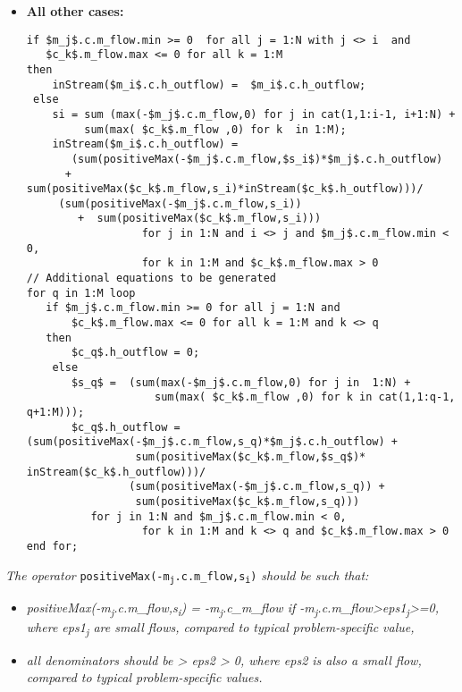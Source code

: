 \begin{itemize}
\item\textbf{All other cases:}\newline
\begin{lstlisting}[language=modelica,mathescape=true]
if $m_j$.c.m_flow.min >= 0  for all j = 1:N with j <> i  and
   $c_k$.m_flow.max <= 0 for all k = 1:M
then
    inStream($m_i$.c.h_outflow) =  $m_i$.c.h_outflow;
 else
    si = sum (max(-$m_j$.c.m_flow,0) for j in cat(1,1:i-1, i+1:N) +
         sum(max( $c_k$.m_flow ,0) for k  in 1:M);
    inStream($m_i$.c.h_outflow) =
       (sum(positiveMax(-$m_j$.c.m_flow,$s_i$)*$m_j$.c.h_outflow)
      +  sum(positiveMax($c_k$.m_flow,s_i)*inStream($c_k$.h_outflow)))/
     (sum(positiveMax(-$m_j$.c.m_flow,s_i))
        +  sum(positiveMax($c_k$.m_flow,s_i)))
                  for j in 1:N and i <> j and $m_j$.c.m_flow.min < 0,
                  for k in 1:M and $c_k$.m_flow.max > 0
// Additional equations to be generated
for q in 1:M loop
   if $m_j$.c.m_flow.min >= 0 for all j = 1:N and
       $c_k$.m_flow.max <= 0 for all k = 1:M and k <> q
   then
       $c_q$.h_outflow = 0;
    else
       $s_q$ =  (sum(max(-$m_j$.c.m_flow,0) for j in  1:N) +
                    sum(max( $c_k$.m_flow ,0) for k in cat(1,1:q-1, q+1:M)));
       $c_q$.h_outflow = (sum(positiveMax(-$m_j$.c.m_flow,s_q)*$m_j$.c.h_outflow) +
                 sum(positiveMax($c_k$.m_flow,$s_q$)* inStream($c_k$.h_outflow)))/
                (sum(positiveMax(-$m_j$.c.m_flow,s_q)) +
                 sum(positiveMax($c_k$.m_flow,s_q)))
		  for j in 1:N and $m_j$.c.m_flow.min < 0,
                  for k in 1:M and k <> q and $c_k$.m_flow.max > 0
end for;
\end{lstlisting}
\end{itemize}
\emph{The operator}
\texttt{positiveMax(-m\textsubscript{j}.c.m\_flow,s\textsubscript{i})}
\emph{should be such that:}

\begin{itemize}
\item
  \emph{positiveMax(-m\textsubscript{j}.c.m\_flow,s\textsubscript{i}) =
  -m\textsubscript{j}.c\_m\_flow if
  -m\textsubscript{j}.c.m\_flow\textgreater{}eps1\textsubscript{j}\textgreater{}=0,
  where eps1\textsubscript{j} are small flows, compared to typical
  problem-specific value,}
\item
  \emph{all denominators should be \textgreater{} eps2 \textgreater{} 0,
  where eps2 is also a small flow, compared to typical problem-specific
  values.}
\end{itemize}

